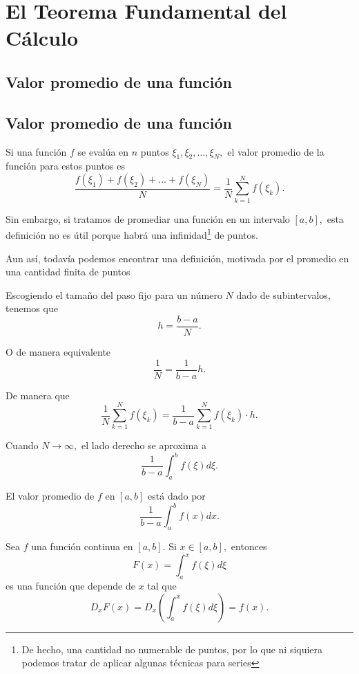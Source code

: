 \section{El Teorema Fundamental del Cálculo}

\subsection{Valor promedio de una función}


 \subsection{Valor promedio de una función}
 Si una función $f$ se evalúa en $n$ puntos $\xi_{1}, \xi_{2},...,\xi_{N},$ el valor promedio de la función para estos puntos es
 $$
 \dfrac{f(\xi_{1})+f(\xi_{2})+...+f(\xi_{N})}{N}=\dfrac{1}{N}\sum_{k=1}^{N}f(\xi_{k}).
 $$



 Sin embargo, si tratamos de promediar una función en un intervalo $[a,b],$ esta definición no es útil porque habrá una infinidad\footnote{De hecho, una cantidad no numerable de puntos, por lo que ni siquiera podemos tratar de aplicar algunas técnicas para series} de puntos.
 

 Aun así, todavía podemos encontrar una definición, motivada por el promedio en una cantidad finita de puntos



 Escogiendo el tamaño del paso fijo para un número $N$ dado de subintervalos, tenemos que
 $$
 h=\dfrac{b-a}{N}.
 $$
 

 O de manera equivalente
 $$
 \dfrac{1}{N}=\dfrac{1}{b-a}h.
 $$




 De manera que
 $$
 \dfrac{1}{N}\sum_{k=1}^{N}f(\xi_{k})=\dfrac{1}{b-a}\sum_{k=1}^{N}f(\xi_{k}) \cdot h.
 $$

 Cuando $N\to \infty,$ el lado derecho se aproxima a
 $$
 \dfrac{1}{b-a} \int_{a}^{b} f(\xi)d\xi.
 $$



 \begin{definicion}
  El valor promedio de $f$ en $[a,b]$ está dado por
  $$
  \dfrac{1}{b-a} \int_{a}^{b} f(x)dx.
  $$
 \end{definicion}




 Sea $f$ una función continua en $[a,b].$ Si $x\in[a,b],$ entonces $$F(x)=\int_{a}^{x}f(\xi)d\xi$$ es una función que depende de $x$ tal que
 \[
  \label{ayr:24.2}
  D_{x}F(x)=D_{x}\left( \int_{a}^{x}f(\xi)d\xi \right)=f(x).
 \]



